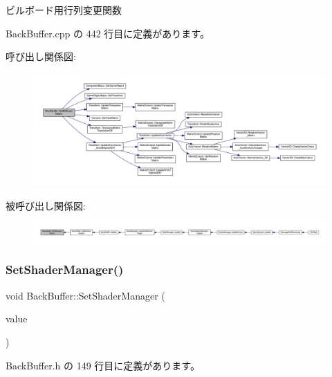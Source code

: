 ビルボード用行列変更関数 



 Back\+Buffer.\+cpp の 442 行目に定義があります。

呼び出し関係図\+:
\nopagebreak
\begin{figure}[H]
\begin{center}
\leavevmode
\includegraphics[width=350pt]{class_back_buffer_a5c9341c9d26576781ec9abb55b937bda_cgraph}
\end{center}
\end{figure}
被呼び出し関係図\+:
\nopagebreak
\begin{figure}[H]
\begin{center}
\leavevmode
\includegraphics[width=350pt]{class_back_buffer_a5c9341c9d26576781ec9abb55b937bda_icgraph}
\end{center}
\end{figure}
\mbox{\label{class_back_buffer_a44566449a4df988cb1cfe5ffbb0455cc}} 
\subsubsection{\texorpdfstring{Set\+Shader\+Manager()}{SetShaderManager()}}
{\footnotesize\ttfamily void Back\+Buffer\+::\+Set\+Shader\+Manager (\begin{DoxyParamCaption}\item[{\mbox{\hyperlink{class_shader_manager}{Shader\+Manager}} $\ast$}]{value }\end{DoxyParamCaption})\hspace{0.3cm}{\ttfamily [inline]}}



 Back\+Buffer.\+h の 149 行目に定義があります。

